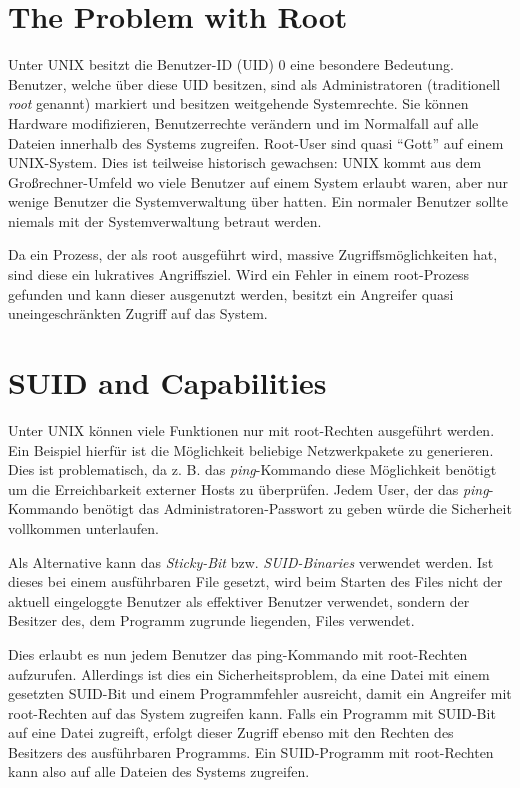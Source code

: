 \section{The Problem with Root}

Unter UNIX besitzt die Benutzer-ID (UID) 0 eine besondere Bedeutung. Benutzer, welche über diese UID besitzen, sind als Administratoren (traditionell \textit{root} genannt) markiert und besitzen weitgehende Systemrechte. Sie können Hardware modifizieren, Benutzerrechte verändern und im Normalfall auf alle Dateien innerhalb des Systems zugreifen. Root-User sind quasi ``Gott'' auf einem UNIX-System. Dies ist teilweise historisch gewachsen: UNIX kommt aus dem Großrechner-Umfeld wo viele Benutzer auf einem System erlaubt waren, aber nur wenige Benutzer die Systemverwaltung über hatten. Ein normaler Benutzer sollte niemals mit der Systemverwaltung betraut werden.

Da ein Prozess, der als root ausgeführt wird, massive Zugriffsmöglichkeiten hat, sind diese ein lukratives Angriffsziel. Wird ein Fehler in einem root-Prozess gefunden und kann dieser ausgenutzt werden, besitzt ein Angreifer quasi uneingeschränkten Zugriff auf das System.

\section{SUID and Capabilities}

Unter UNIX können viele Funktionen nur mit root-Rechten ausgeführt werden. Ein Beispiel hierfür ist die Möglichkeit beliebige Netzwerkpakete zu generieren. Dies ist problematisch, da z. B. das \textit{ping}-Kommando diese Möglichkeit benötigt um die Erreichbarkeit externer Hosts zu überprüfen. Jedem User, der das \textit{ping}-Kommando benötigt das Administratoren-Passwort zu geben würde die Sicherheit vollkommen unterlaufen.

Als Alternative kann das \textit{Sticky-Bit} bzw. \textit{SUID-Binaries} verwendet werden. Ist dieses bei einem ausführbaren File gesetzt, wird beim Starten des Files nicht der aktuell eingeloggte Benutzer als effektiver Benutzer verwendet, sondern der Besitzer des, dem Programm zugrunde liegenden, Files verwendet.

Dies erlaubt es nun jedem Benutzer das ping-Kommando mit root-Rechten aufzurufen. Allerdings ist dies ein Sicherheitsproblem, da eine Datei mit einem gesetzten SUID-Bit und einem Programmfehler ausreicht, damit ein Angreifer mit root-Rechten auf das System zugreifen kann. Falls ein Programm mit SUID-Bit auf eine Datei zugreift, erfolgt dieser Zugriff ebenso mit den Rechten des Besitzers des ausführbaren Programms. Ein SUID-Programm mit root-Rechten kann also auf alle Dateien des Systems zugreifen.

